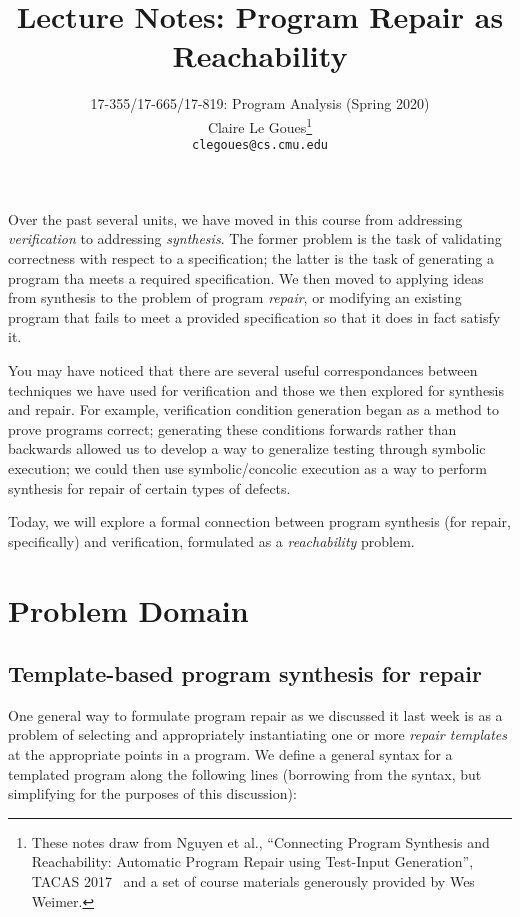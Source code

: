 \documentclass[11pt]{article}
\title{Lecture Notes: Program Repair as Reachability}
\author{17-355/17-665/17-819: Program Analysis (Spring 2020)\\
  Claire Le Goues\footnote{These notes draw from Nguyen et al., ``Connecting
    Program Synthesis and Reachability: Automatic Program Repair using
    Test-Input Generation'', TACAS 2017~\cite{tacas2017} and
    a set of course materials generously provided by Wes Weimer.}\\
  {\tt clegoues@cs.cmu.edu}}
\date{}
\begin{document}
\maketitle

Over the past several units, we have moved in this course from addressing
\emph{verification} to addressing \emph{synthesis}.  The former problem is the
task of validating correctness with respect to a specification; the latter
is the task of generating a program tha meets a required specification.  We then
moved to applying ideas from synthesis to the problem of program \emph{repair},
or modifying an existing program that fails to meet a provided specification so
that it does in fact satisfy it. 

You may have noticed that there are several useful correspondances between
techniques we have used for verification and those we then explored for
synthesis and repair.  For example, verification condition generation began as a
method to prove programs correct; generating these conditions forwards rather
than backwards allowed us to develop a way to generalize testing through
symbolic execution; we could then use symbolic/concolic execution as a way to
perform synthesis for repair of certain types of defects.  

Today, we will explore a formal connection between program synthesis (for
repair, specifically) and verification, formulated as a \emph{reachability}
problem.  

\section{Problem Domain} 

\subsection{Template-based program synthesis for repair}

One general way to formulate program repair as we discussed it last week is as a
problem of selecting and appropriately instantiating one or more \emph{repair
  templates} at the appropriate points in a program. We define a general syntax
for a templated program along the following lines (borrowing from the \WhileLang
syntax, but simplifying for the purposes of this discussion):


\newcommand\df{\bnfdef}
\newcommand\da{\bnfalt}
\newcommand\skips{\mbox{skip}}
\newcommand\ifs{\mbox{if}~ P ~\mbox{then}~ S_1 ~\mbox{else}~ S_2}
\newcommand\whiles{\mbox{while}~ P ~\mbox{do}~ S}
\end{document}
